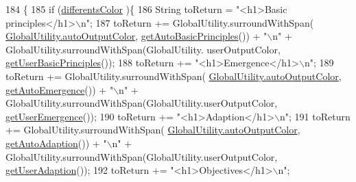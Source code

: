 \begin{DoxyCode}
184                             \{
185         \textcolor{keywordflow}{if} (\hyperlink{classit_1_1isislab_1_1masonassisteddocumentation_1_1_o_d_d_1_1_design_concepts_a5ea1975d56d262992b3082689ec89e9b}{differentsColor} )\{
186             String toReturn = \textcolor{stringliteral}{"<h1>Basic principles</h1>\(\backslash\)n"};
187             toReturn += GlobalUtility.surroundWithSpan(
      \hyperlink{classit_1_1isislab_1_1masonassisteddocumentation_1_1mason_1_1analizer_1_1_global_utility_a2e086c8a2d8edf16b2eaf90408832adc}{GlobalUtility.autoOutputColor}, 
      \hyperlink{classit_1_1isislab_1_1masonassisteddocumentation_1_1_o_d_d_1_1_design_concepts_ad75bf46cbf179f05163ee5910a8266f4}{getAutoBasicPrinciples}()) + \textcolor{stringliteral}{"\(\backslash\)n"} + GlobalUtility.surroundWithSpan(GlobalUtility.
      userOutputColor, \hyperlink{classit_1_1isislab_1_1masonassisteddocumentation_1_1_o_d_d_1_1_design_concepts_ae659768d4ca7393a7c12437782cdfb08}{getUserBasicPrinciples}());
188             toReturn += \textcolor{stringliteral}{"<h1>Emergence</h1>\(\backslash\)n"};
189             toReturn += GlobalUtility.surroundWithSpan(
      \hyperlink{classit_1_1isislab_1_1masonassisteddocumentation_1_1mason_1_1analizer_1_1_global_utility_a2e086c8a2d8edf16b2eaf90408832adc}{GlobalUtility.autoOutputColor}, \hyperlink{classit_1_1isislab_1_1masonassisteddocumentation_1_1_o_d_d_1_1_design_concepts_ae58f86f22178b1faf7f236ff6f190f92}{getAutoEmergence}()) + \textcolor{stringliteral}{"\(\backslash\)n"} + 
      GlobalUtility.surroundWithSpan(GlobalUtility.userOutputColor, \hyperlink{classit_1_1isislab_1_1masonassisteddocumentation_1_1_o_d_d_1_1_design_concepts_a750ba093a32640363c02c324debc9b30}{getUserEmergence}());
190             toReturn += \textcolor{stringliteral}{"<h1>Adaption</h1>\(\backslash\)n"};
191             toReturn += GlobalUtility.surroundWithSpan(
      \hyperlink{classit_1_1isislab_1_1masonassisteddocumentation_1_1mason_1_1analizer_1_1_global_utility_a2e086c8a2d8edf16b2eaf90408832adc}{GlobalUtility.autoOutputColor}, \hyperlink{classit_1_1isislab_1_1masonassisteddocumentation_1_1_o_d_d_1_1_design_concepts_a43b059cadf98d392631539dbc65e2330}{getAutoAdaption}()) + \textcolor{stringliteral}{"\(\backslash\)n"} + 
      GlobalUtility.surroundWithSpan(GlobalUtility.userOutputColor, \hyperlink{classit_1_1isislab_1_1masonassisteddocumentation_1_1_o_d_d_1_1_design_concepts_a5e27e4e0b57d38733adf6e78de770d04}{getUserAdaption}());
192             toReturn += \textcolor{stringliteral}{"<h1>Objectives</h1>\(\backslash\)n"};

\end{DoxyCode}
